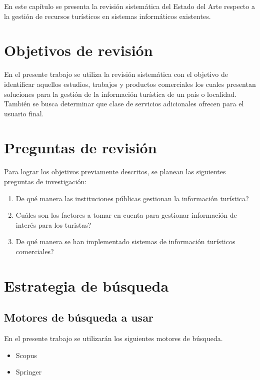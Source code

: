 \documentclass{report}
\begin{document}
En este capítulo se presenta la revisión sistemática del Estado del Arte
respecto a la gestión de recursos turísticos en sistemas informáticos existentes.

\section{Objetivos de revisión}

En el presente trabajo se utiliza la revisión sistemática con el objetivo de
identificar aquellos estudios, trabajos y productos comerciales los cuales presentan
soluciones para la gestión de la información turística de un país o localidad.
También se busca determinar que clase de servicios adicionales ofrecen para el
usuario final.

\section{Preguntas de revisión}

Para lograr los objetivos previamente descritos, se planean las siguientes preguntas
de investigación:

\begin{enumerate}
    \item{De qué manera las instituciones públicas gestionan la información
        turística?}
    \item{Cuáles son los factores a tomar en cuenta para gestionar información
        de interés para los turistas?}
    \item{De qué manera se han implementado sistemas de información turísticos
        comerciales?}
\end{enumerate}

\section{Estrategia de búsqueda}

\subsection{Motores de búsqueda a usar}

En el presente trabajo se utilizarán los siguientes motores de búsqueda.

\begin{itemize}
    \item{Scopus}
    \item{Springer}
\end{itemize}
\end{document}
